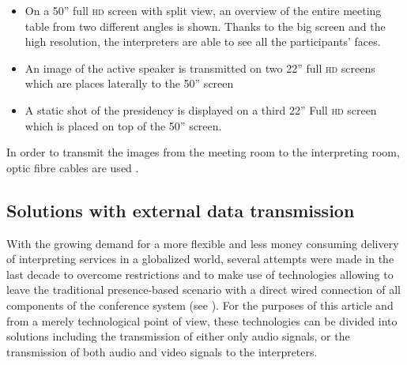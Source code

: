 \documentclass[output=paper]{langsci/langscibook}
\begin{document}
\begin{itemize}
\item On a 50” full \textsc{hd} screen with split view, an overview of the entire meeting table from two different angles is shown. Thanks to the big screen and the high resolution, the interpreters are able to see all the participants’ faces.
\item An image of the active speaker is transmitted on two 22” full \textsc{hd} screens which are places laterally to the 50” screen
\item A static shot of the presidency is displayed on a third 22” Full \textsc{hd} screen which is placed on top of the 50” screen.
\end{itemize}

In order to transmit the images from the meeting room to the interpreting room, optic fibre cables are used \citep{Technical2016}. 

\subsection{Solutions with external data transmission} 
\label{sub:ziegler:4.2}
With the growing demand for a more flexible and less money consuming delivery of interpreting services in a globalized world, several attempts were made in the last decade to overcome restrictions and to make use of technologies allowing to leave the traditional presence-based scenario with a direct wired connection of all components of the conference system (see ). For the purposes of this article and from a merely technological point of view, these technologies can be divided into solutions including the transmission of either only audio signals, or the transmission of both audio and video signals to the interpreters. 
\end{document}

